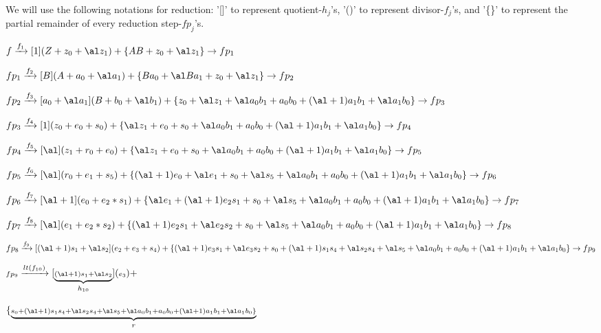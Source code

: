 \begin{Example}
We will use the following notations for reduction: '[]' to represent quotient-$h_j$'s, '()' to represent divisor-$f_j$'s, and '\{\}' to represent the partial remainder of every reduction step-$fp_j$'s.

\begin{small}
$f\xrightarrow[]{f_{1}}[1](Z + z_0 +\al z_1)+\{ AB+z_0+\al z_1\}\rightarrow fp_1$

$fp_1\xrightarrow[]{f_2}[B](A+a_0+\al a_1)+\{Ba_0+\al Ba_1+z_0+\al z_1\}\rightarrow fp_2$

$fp_2\xrightarrow[]{f_3}[a_0+\al a_1](B+b_0+\al b_1)+\{z_0+\al z_1+\al a_0b_1+a_0b_0+ (\al+1)a_1b_1 + \al a_1b_0\}\rightarrow fp_3$

$fp_3\xrightarrow[]{f_4}[1](z_0+e_0+s_0)+\{\al z_1+e_0+s_0+\al a_0b_1+a_0b_0+(\al+1)a_1b_1+\al a_1b_0\}\rightarrow fp_4$

$fp_4\xrightarrow[]{f_5}[\al](z_1+r_0+e_0)+\{\al z_1+e_0+s_0+\al a_0b_1+a_0b_0+(\al+1)a_1b_1+\al a_1b_0\}\rightarrow fp_5$

$fp_5\xrightarrow[]{f_6}[\al](r_0+e_1+s_5)+\{(\al+1)e_0+\al e_1+s_0+\al s_5+\al a_0b_1+a_0b_0+(\al+1)a_1b_1+\al a_1b_0\}\rightarrow fp_6$

$fp_6\xrightarrow[]{f_7}[\al+1](e_0+e_2*s_1)+\{\al e_1+(\al+1)e_2s_1+s_0+\al s_5+\al a_0b_1+a_0b_0+(\al+1)a_1b_1+\al a_1b_0\}\rightarrow fp_7$

$fp_7\xrightarrow[]{f_8}[\al](e_1+e_2*s_2)+\{(\al+1)e_2s_1+\al e_2s_2 + s_0+\al s_5+\al a_0b_1+a_0b_0+(\al+1)a_1b_1+\al a_1b_0\}\rightarrow fp_8$

$fp_8\xrightarrow[]{f_9}[(\al+1)s_1 + \al s_2](e_2+e_3+s_4)+\{(\al+1)e_3s_1+ \al e_3s_2 +s_0+(\al+1)s_1s_4+\al s_2s_4+\al s_5+\al a_0b_1+a_0b_0+(\al+1)a_1b_1+\al a_1b_0\}\rightarrow fp_9$
\end{small}

\begin{tiny}
${\scriptstyle fp_9}\xrightarrow[]{{\scriptstyle lt(f_{10})}}[\underbrace{{\scriptstyle (\al+1)s_1+\al s_2}}_\text{$h_{10}$}]({\scriptstyle e_3})+$ 

$\{\underbrace{{\scriptstyle s_0+(\al+1)s_1s_4+\al s_2s_4+\al s_5+\al a_0b_1+a_0b_0+(\al+1)a_1b_1+\al a_1b_0\}}}_\text{$r$}$ 
\end{tiny}


\end{Example}
